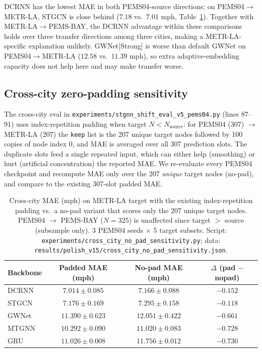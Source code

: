 DCRNN has the lowest MAE in both PEMS04-source directions; on PEMS04$\to$METR-LA,
STGCN is close behind ($7.18$ vs.\ $7.01$ mph, Table~\ref{tab:no_pad_sensitivity}).
Together with METR-LA$\to$PEMS-BAY, the DCRNN advantage within these comparisons
holds over three transfer directions among three cities, making a
METR-LA-specific explanation unlikely. GWNet[Strong] is worse than default
GWNet on PEMS04$\to$METR-LA ($12.58$ vs.\ $11.39$ mph), so extra
adaptive-embedding capacity does not help here and may make transfer worse.

\subsection{Cross-city zero-padding sensitivity}
\label{sec:appendix_no_pad_sensitivity}

The cross-city eval in
\texttt{experiments/stgnn\_shift\_eval\_v5\_pems04.py} (lines 87--91) uses
index-repetition padding when target $N < N_{\mathrm{source}}$: for PEMS04 (307) $\to$
METR-LA (207) the \texttt{keep} list is the 207 unique target nodes followed
by 100 copies of node index 0, and MAE is averaged over all 307 prediction
slots. The duplicate slots feed a single repeated input, which can either
help (smoothing) or hurt (artificial concentration) the reported MAE. We
re-evaluate every PEMS04 checkpoint and recompute MAE only over the 207
\emph{unique} target nodes (no-pad), and compare to the existing 307-slot
padded MAE.

\begin{table}[h]
\centering
\small
\caption{Cross-city MAE (mph) on METR-LA target with the existing
index-repetition padding vs.\ a no-pad variant that scores only the 207
unique target nodes. PEMS04 $\to$ PEMS-BAY ($N{=}325$) is unaffected since
target $>$ source (subsample only). 3 PEMS04 seeds $\times$ 5 target subsets.
Script: \texttt{experiments/cross\_city\_no\_pad\_sensitivity.py};
data: \texttt{results/polish\_v15/cross\_city\_no\_pad\_sensitivity.json}.}
\label{tab:no_pad_sensitivity}
\vskip 0.05in
\begin{tabular}{lccc}
\toprule
\textbf{Backbone} & \textbf{Padded MAE (mph)} & \textbf{No-pad MAE (mph)} & \textbf{$\Delta$ (pad $-$ nopad)} \\
\midrule
DCRNN  & $7.014 \pm 0.085$  & $7.166 \pm 0.088$  & $-0.152$ \\
STGCN  & $7.176 \pm 0.169$  & $7.295 \pm 0.158$  & $-0.118$ \\
GWNet  & $11.390 \pm 0.623$ & $12.051 \pm 0.422$ & $-0.661$ \\
MTGNN  & $10.292 \pm 0.090$ & $11.020 \pm 0.083$ & $-0.728$ \\
GRU    & $11.026 \pm 0.008$ & $11.756 \pm 0.012$ & $-0.730$ \\
\bottomrule
\end{tabular}
\end{table}

